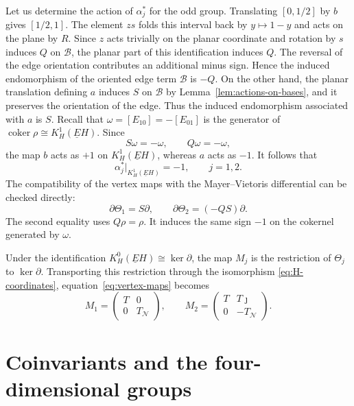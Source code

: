 \documentclass[11pt]{amsart}
\newcommand{\coker}{\operatorname{coker}}
\newcommand{\KC}[2]{K^{#1}_{#2}(\underline E#2)}
\theoremstyle{remark}
\numberwithin{equation}{section}
\begin{document}
Let us determine the action of $\alpha_j^*$ for the odd group. Translating $[0,1/2]$ by $b$ gives $[1/2,1]$. The element $zs$ folds this interval back by $y\mapsto1-y$ and acts on the plane by $R$. Since $z$ acts trivially on the planar coordinate and rotation by $s$ induces $Q$ on $\mathcal B$, the planar part of this identification induces $Q$. The reversal of the edge orientation contributes an additional minus sign. Hence the induced endomorphism of the oriented edge term $\mathcal B$ is $-Q$. On the other hand, the planar translation defining $a$ induces $S$ on $\mathcal B$ by Lemma~\ref{lem:actions-on-bases}, and it preserves the orientation of the edge. Thus the induced endomorphism associated with $a$ is $S$. Recall that $\omega=[E_{10}]=-[E_{01}]$ is the generator of $\coker\rho\cong\KC{1}{H}$. Since
\[
 S\omega=-\omega,\qquad Q\omega=-\omega,
\]
the map $b$ acts as $+1$ on $\KC{1}{H}$, whereas $a$ acts as $-1$. It follows that
\begin{equation}\label{eq:odd-sign}
 \alpha_j^*\big|_{\KC{1}{H}}=-1,\qquad j=1,2.
\end{equation}
The compatibility of the vertex maps with the Mayer--Vietoris differential can be checked directly:
\[
 \partial\Theta_1=S\partial,\qquad
 \partial\Theta_2=(-QS)\partial.
\]
The second equality uses $Q\rho=\rho$. It induces the same sign $-1$ on the cokernel generated by $\omega$.

Under the identification $\KC{0}{H}\cong\ker\partial$, the map $M_j$ is the restriction of $\Theta_j$ to $\ker\partial$. Transporting this restriction through the isomorphism \eqref{eq:H-coordinates}, equation~\eqref{eq:vertex-maps} becomes
\begin{equation}\label{eq:monodromy-blocks}
 M_1=\begin{pmatrix}T&0\\0&T_{\mathcal N}\end{pmatrix},\qquad
 M_2=\begin{pmatrix}T&T\jmath\\0&-T_{\mathcal N}\end{pmatrix}.
\end{equation}

\section{Coinvariants and the four-dimensional groups}\label{section:coinvariants}
\end{document}
